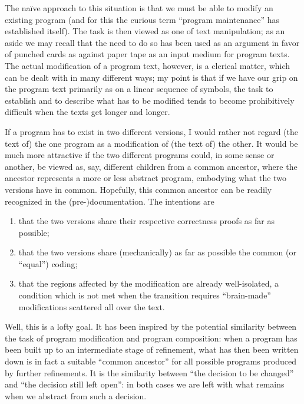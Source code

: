 The naïve approach to this situation is that we must be able to modify an existing program (and for this the curious term ``program maintenance'' has established itself). The task is then viewed as one of text manipulation; as an aside we may recall that the need to do so has been used as an argument in favor of punched cards as against paper tape as an input medium for program texts. The actual modification of a program text, however, is a clerical matter, which can be dealt with in many different ways; my point is that if we have our grip on the program text  primarily as on a linear sequence of symbols, the task to establish and to describe what has to be modified tends to become prohibitively difficult when the texts get longer and longer.

If a program has to exist in two different versions, I would rather not regard (the text of) the one program as a modification of (the text of) the other. It would be much more attractive if the two different programs could, in some sense or another, be viewed as, say, different children from a common ancestor, where the ancestor represents a more or less abstract program, embodying what the two versions have in common. Hopefully, this common ancestor can be readily recognized in the (pre-)documentation. The intentions are

\begin{enumerate}[wide, nosep, label=(\arabic*)]
	\item that the two versions share their respective correctness proofs as far as possible;

	\item that the two versions share (mechanically) as far as possible the common (or ``equal'') coding;

	\item that the regions affected by the modification are already well-isolated, a condition which is not met when the transition requires ``brain-made'' modifications scattered all over the text.
\end{enumerate}

Well, this is a lofty goal. It has been inspired by the potential similarity between the task of program modification and program composition: when a program has been built up to an intermediate stage of refinement, what has then been written down is in fact a suitable ``common ancestor'' for all possible programs produced by further refinements. It is the similarity between ``the decision to be changed'' and ``the decision still left open'': in both cases we are left with what remains when we abstract from such a decision.

